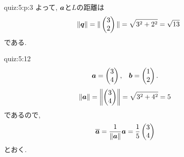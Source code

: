 \begin{answerof}{quiz:5:p:3}
  よって, $\boldsymbol{a}$と$L$の距離は
  \begin{align*}
    \|\boldsymbol{q}\|= \|\begin{pmatrix}3\\2\end{pmatrix}\|=\sqrt{3^2+2^2}=\sqrt{13}
  \end{align*}
  である.
\end{answerof}
  
\begin{answerof}{quiz:5:12}
  \begin{align*}
    \boldsymbol{a}&=\begin{pmatrix}3\\4\end{pmatrix},&
    \boldsymbol{b}&=\begin{pmatrix}1\\2\end{pmatrix}.
  \end{align*}
  \begin{align*}
    \|\boldsymbol{a}\|
    &=\left\|\begin{pmatrix}3\\4\end{pmatrix}\right\|
    =\sqrt{3^2+4^2}=5
  \end{align*}
  であるので,
  \begin{align*}
    \overline{\boldsymbol{a}}
    &=\frac{1}{\|\boldsymbol{a}\|}\boldsymbol{a}
    =\frac{1}{5}\begin{pmatrix}3\\4\end{pmatrix}
  \end{align*}
  とおく.


\end{answerof}
